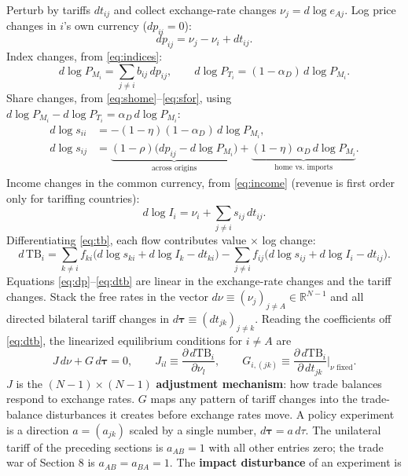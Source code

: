 \documentclass[11pt]{article}
\begin{document}
Perturb by tariffs $dt_{ij}$ and collect exchange-rate changes $\nu_j = d\log e_{Aj}$. Log price changes in $i$'s own currency ($dp_{ii} = 0$):
\begin{equation}
dp_{ij} = \nu_j - \nu_i + dt_{ij} .
\label{eq:dp}
\end{equation}
Index changes, from \eqref{eq:indices}:
\begin{equation}
d\log P_{M_i} = \sum_{j\neq i} b_{ij}\, dp_{ij},
\qquad
d\log P_{T_i} = (1-\alpha_D)\, d\log P_{M_i} .
\label{eq:dindex}
\end{equation}
Share changes, from \eqref{eq:shome}--\eqref{eq:sfor}, using $d\log P_{M_i} - d\log P_{T_i} = \alpha_D\, d\log P_{M_i}$:
\begin{align}
d\log s_{ii} &= -(1-\eta)(1-\alpha_D)\, d\log P_{M_i},
\label{eq:dshome}\\
d\log s_{ij} &= \underbrace{(1-\rho)\big( dp_{ij} - d\log P_{M_i} \big)}_{\text{across origins}}
+ \underbrace{(1-\eta)\,\alpha_D\, d\log P_{M_i}}_{\text{home vs.\ imports}} .
\label{eq:dsfor}
\end{align}
Income changes in the common currency, from \eqref{eq:income} (revenue is first order only for tariffing countries):
\begin{equation}
d\log I_i = \nu_i + \sum_{j\neq i} s_{ij}\, dt_{ij} .
\label{eq:dincome}
\end{equation}
Differentiating \eqref{eq:tb}, each flow contributes value $\times$ log change:
\begin{equation}
d\,\mathrm{TB}_i
= \sum_{k \neq i} f_{ki} \big( d\log s_{ki} + d\log I_k - dt_{ki} \big)
- \sum_{j \neq i} f_{ij} \big( d\log s_{ij} + d\log I_i - dt_{ij} \big) .
\label{eq:dtb}
\end{equation}
Equations \eqref{eq:dp}--\eqref{eq:dtb} are linear in the exchange-rate changes and the tariff changes. Stack the free rates in the vector $d\nu \equiv (\nu_j)_{j \neq A} \in \mathbb{R}^{N-1}$ and all directed bilateral tariff changes in $d\boldsymbol{\tau} \equiv (dt_{jk})_{j \neq k}$. Reading the coefficients off \eqref{eq:dtb}, the linearized equilibrium conditions for $i \neq A$ are
\begin{equation}
J\, d\nu + G\, d\boldsymbol{\tau} = 0,
\qquad
J_{il} \equiv \frac{\partial\, d\mathrm{TB}_i}{\partial \nu_l},
\qquad
G_{i,(jk)} \equiv \frac{\partial\, d\mathrm{TB}_i}{\partial\, dt_{jk}}\bigg|_{\nu \text{ fixed}} .
\label{eq:JFdef}
\end{equation}
$J$ is the $(N-1)\times(N-1)$ \textbf{adjustment mechanism}: how trade balances respond to exchange rates. $G$ maps any pattern of tariff changes into the trade-balance disturbances it creates before exchange rates move. A policy experiment is a direction $a = (a_{jk})$ scaled by a single number, $d\boldsymbol{\tau} = a\, d\tau$. The unilateral tariff of the preceding sections is $a_{AB} = 1$ with all other entries zero; the trade war of Section 8 is $a_{AB} = a_{BA} = 1$. The \textbf{impact disturbance} of an experiment is
\end{document}
